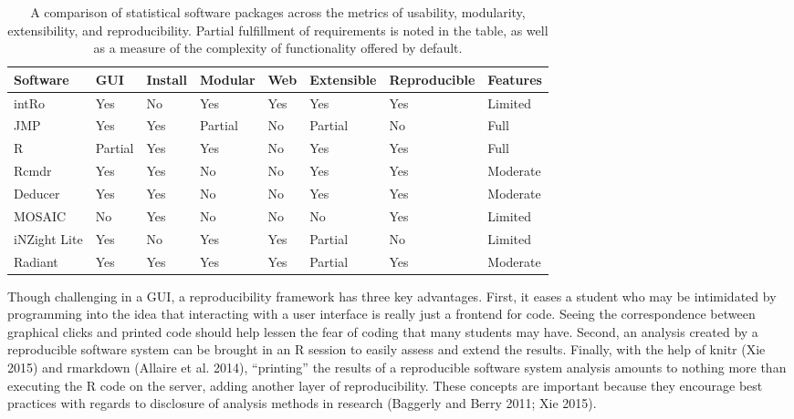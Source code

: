 \documentclass[12pt,]{article}
\begin{document}
\begin{table}[ht]
\centering
\begin{tabular}{llllllll}
  \hline
Software & GUI & Install & Modular & Web & Extensible & Reproducible & Features \\ 
  \hline
intRo & Yes & No & Yes & Yes & Yes & Yes & Limited \\ 
  JMP & Yes & Yes & Partial & No & Partial & No & Full \\ 
  R & Partial & Yes & Yes & No & Yes & Yes & Full \\ 
  Rcmdr & Yes & Yes & No & No & Yes & Yes & Moderate \\ 
  Deducer & Yes & Yes & No & No & Yes & Yes & Moderate \\ 
  MOSAIC & No & Yes & No & No & No & Yes & Limited \\ 
  iNZight Lite & Yes & No & Yes & Yes & Partial & No & Limited \\ 
  Radiant & Yes & Yes & Yes & Yes & Partial & Yes & Moderate \\ 
   \hline
\end{tabular}
\caption{A comparison of statistical software packages across the metrics of usability, modularity, extensibility, and reproducibility. Partial fulfillment of requirements is noted in the table, as well as a measure of the complexity of functionality offered by default.} 
\label{tab:compare}
\end{table}

Though challenging in a GUI, a reproducibility framework has three key
advantages. First, it eases a student who may be intimidated by
programming into the idea that interacting with a user interface is
really just a frontend for code. Seeing the correspondence between
graphical clicks and printed code should help lessen the fear of coding
that many students may have. Second, an analysis created by a
reproducible software system can be brought in an R session to easily
assess and extend the results. Finally, with the help of knitr (Xie
2015) and rmarkdown (Allaire et al. 2014), ``printing'' the results of a
reproducible software system analysis amounts to nothing more than
executing the R code on the server, adding another layer of
reproducibility. These concepts are important because they encourage
best practices with regards to disclosure of analysis methods in
research (Baggerly and Berry 2011; Xie 2015).
\end{document}
